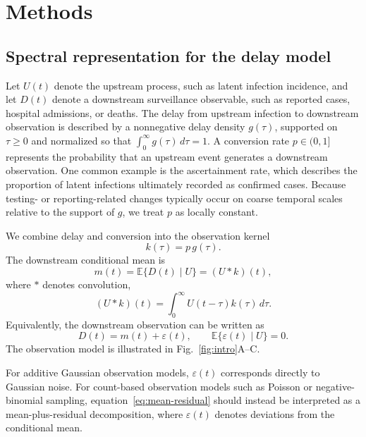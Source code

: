 \section*{Methods}

\subsection*{Spectral representation for the delay model}

Let \(U(t)\) denote the upstream process, such as latent infection incidence, and let \(D(t)\) denote a downstream surveillance observable, such as reported cases, hospital admissions, or deaths. The delay from upstream infection to downstream observation is described by a nonnegative delay density \(g(\tau)\), supported on \(\tau\ge0\) and normalized so that \(\int_0^\infty g(\tau)\,d\tau=1\). A conversion rate \(p\in(0,1]\) represents the probability that an upstream event generates a downstream observation. One common example is the ascertainment rate, which describes the proportion of latent infections ultimately recorded as confirmed cases. Because testing- or reporting-related changes typically occur on coarse temporal scales \cite{colman2023ascertainment,eales2023dynamics,ward2024real} relative to the support of \(g\), we treat \(p\) as locally constant.

We combine delay and conversion into the observation kernel
\[
k(\tau)=p\,g(\tau).
\]
The downstream conditional mean is
\begin{equation}
m(t)
=
\mathbb E\{D(t)\mid U\}
=
(U*k)(t),
\label{eq:delay-mean}
\end{equation}
where \(*\) denotes convolution,
\[
(U*k)(t)=\int_0^\infty U(t-\tau)k(\tau)\,d\tau .
\]
Equivalently, the downstream observation can be written as
\begin{equation}
D(t)=m(t)+\varepsilon(t),
\qquad
\mathbb E\{\varepsilon(t)\mid U\}=0.
\label{eq:mean-residual}
\end{equation}
The observation model is illustrated in Fig.~\ref{fig:intro}A--C.

For additive Gaussian observation models, \(\varepsilon(t)\) corresponds directly to Gaussian noise. For count-based observation models such as Poisson or negative-binomial sampling, equation~\eqref{eq:mean-residual} should instead be interpreted as a mean-plus-residual decomposition, where \(\varepsilon(t)\) denotes deviations from the conditional mean.

